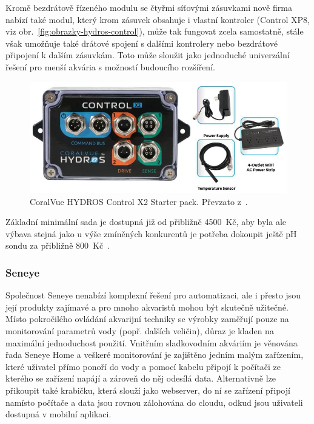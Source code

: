             Kromě bezdrátově řízeného modulu se čtyřmi síťovými zásuvkami nově firma nabízí také modul, který krom zásuvek obsahuje i vlastní kontroler (Control XP8, viz obr.~\ref{fig:obrazky-hydros-control}), může tak fungovat zcela samostatně, stále však umožňuje také drátové spojení s dalšími kontrolery nebo bezdrátové připojení k dalším zásuvkám. Toto může sloužit jako jednoduché univerzální řešení pro menší akvária s možností budoucího rozšíření. 

            \begin{figure}[h!]
                \centering
                \includegraphics[width=\textwidth]{obrazky/trh/hydros-x2-starter-pack.jpg}
                \caption{CoralVue HYDROS Control X2 Starter pack. Převzato z~\cite{eshop-coralvue-hydros}.}
                \label{fig:obrazky-trh-hydros-x2-starter-pack-jpg}
            \end{figure}
            
            Základní minimální sada je dostupná již od přibližně \qty{4500}{Kč}, aby byla ale výbava stejná jako u výše zmíněných konkurentů je potřeba dokoupit ještě pH sondu za přibližně \qty{800}{Kč}~\cite{coralvuehydros,eshop-coralvue-hydros}.
            
        \subsubsection{Seneye}
            Společnost Seneye nenabízí komplexní řešení pro automatizaci, ale i přesto jsou její produkty zajímavé a pro mnoho akvaristů mohou být skutečně užitečné. Místo pokročilého ovládání akvarijní techniky se výrobky zaměřují pouze na monitorování parametrů vody (popř. dalších veličin), důraz je kladen na maximální jednoduchost použití. Vnitřním sladkovodním akváriím je věnována řada Seneye Home a veškeré monitorování je zajištěno jedním malým zařízením, které uživatel přímo ponoří do vody a pomocí kabelu připojí k počítači ze kterého se zařízení napájí a zároveň do něj odesílá data. Alternativně lze přikoupit také krabičku, která slouží jako webserver, do ní se zařízení připojí namísto počítače a data jsou rovnou zálohována do cloudu, odkud jsou uživateli dostupná v mobilní aplikaci.


